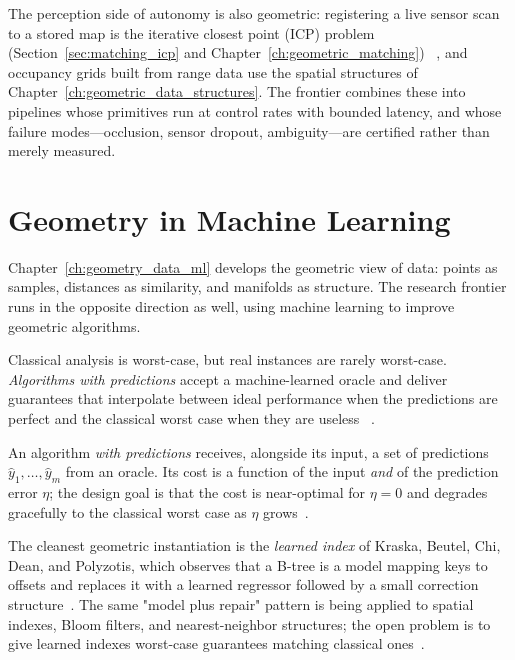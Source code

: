 The perception side of autonomy is also geometric: registering a live sensor
scan to a stored map is the iterative closest point (ICP) problem
(Section~\ref{sec:matching_icp} and Chapter~\ref{ch:geometric_matching})
~\cite{besl1992}, and occupancy grids built from range data use the spatial
structures of Chapter~\ref{ch:geometric_data_structures}. The frontier combines
these into pipelines whose primitives run at control rates with bounded
latency, and whose failure modes---occlusion, sensor dropout, ambiguity---are
certified rather than merely measured.

\section{Geometry in Machine Learning}
\label{sec:frontiers_ml}

Chapter~\ref{ch:geometry_data_ml} develops the geometric view of data: points
as samples, distances as similarity, and manifolds as structure. The research
frontier runs in the opposite direction as well, using machine learning to
improve geometric algorithms.

Classical analysis is worst-case, but real instances are rarely worst-case.
\emph{Algorithms with predictions} accept a machine-learned oracle and deliver
guarantees that interpolate between ideal performance when the predictions are
perfect and the classical worst case when they are useless
~\cite{mitzenmacher2022}.

\begin{definition}\label{def:frontiers_learning_augmented}
An algorithm \emph{with predictions} receives, alongside its input, a set of
predictions $\hat{y}_1, \ldots, \hat{y}_m$ from an oracle. Its cost is a
function of the input \emph{and} of the prediction error $\eta$; the design
goal is that the cost is near-optimal for $\eta = 0$ and degrades gracefully
to the classical worst case as $\eta$ grows~\cite{mitzenmacher2022}.
\end{definition}

The cleanest geometric instantiation is the \emph{learned index} of Kraska,
Beutel, Chi, Dean, and Polyzotis, which observes that a B-tree is a model
mapping keys to offsets and replaces it with a learned regressor followed by a
small correction structure~\cite{kraska2018}. The same "model plus repair"
pattern is being applied to spatial indexes, Bloom filters, and
nearest-neighbor structures; the open problem is to give learned indexes
worst-case guarantees matching classical ones~\cite{kraska2018,mitzenmacher2022}.

